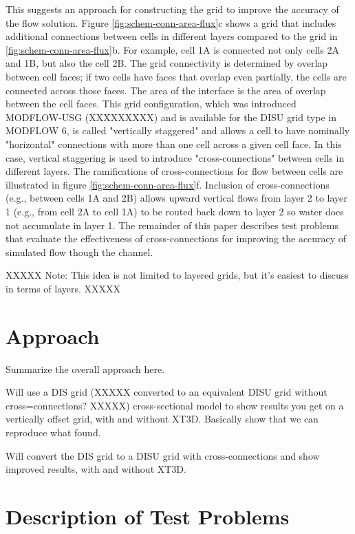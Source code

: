 \documentclass{article}
\begin{document}
This suggests an approach for constructing the grid to improve the accuracy of the flow solution. Figure \ref{fig:schem-conn-area-flux}c shows a grid that includes additional connections between cells in different layers compared to the grid in \ref{fig:schem-conn-area-flux}b. For example, cell 1A is connected not only cells 2A and 1B, but also the cell 2B. The grid connectivity is determined by overlap between cell faces; if two cells have faces that overlap even partially, the cells are connected across those faces. The area of the interface is the area of overlap between the cell faces. This grid configuration, which was introduced MODFLOW-USG (XXXXXXXXX) and is available for the DISU grid type in MODFLOW 6, is called "vertically staggered" and allows a cell to have nominally "horizontal" connections with more than one cell across a given cell face. In this case, vertical staggering is used to introduce "cross-connections" between cells in different layers. The ramifications of cross-connections for flow between cells are illustrated in figure \ref{fig:schem-conn-area-flux}f. Inclusion of cross-connections (e.g., between cells 1A and 2B) allows upward vertical flows from layer 2 to layer 1 (e.g., from cell 2A to cell 1A) to be routed back down to layer 2 so water does not accumulate in layer 1. The remainder of this paper describes test problems that evaluate the effectiveness of cross-connections for improving the accuracy of simulated flow though the channel.

XXXXX Note: This idea is not limited to layered grids, but it's easiest to discuss in terms of layers. XXXXX

\section{Approach}

Summarize the overall approach here.

Will use a DIS grid (XXXXX converted to an equivalent DISU grid without cross=connections? XXXXX) cross-sectional model to show results you get on a vertically offset grid, with and without XT3D. Basically show that we can reproduce what \cite{bardot2022} found.

Will convert the DIS grid to a DISU grid with cross-connections and show improved results, with and without XT3D.

\section{Description of Test Problems}
\end{document}
